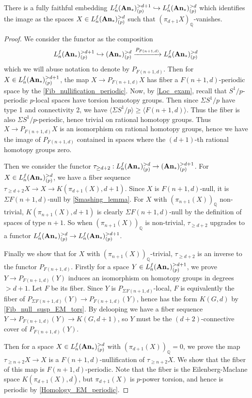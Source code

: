 	\begin{prop}\label{Tel_loc_conn_var_rational}
		There is a fully faithful embedding $L_n^f(\mathbf{An}_*)_{(p)}^{>d+1}\hookrightarrow L_n^f(\mathbf{An}_*)_{(p)}^{>d}$ which identifies the image as the spaces $X\in L_n^f(\mathbf{An}_*)_{(p)}^{>d}$ such that $(\pi_{d+1}X)_\mathbb{Q}$-vanishes. 
	\end{prop}
	\begin{proof}
		We consider the functor as the composition 
		\[ L_n^f(\mathbf{An}_*)_{(p)}^{>d+1}\hookrightarrow(\mathbf{An}_*)_{(p)}^{>d}\xrightarrow{P_{F(n+1,d)}}L_n^f(\mathbf{An}_*)_{(p)}^{>d} \]
		which we will abuse notation to denote by $P_{F(n+1,d)}$. Then for $X\in L_n^f(\mathbf{An}_*)_{(p)}^{>d+1}$, the map $X\to P_{F(n+1,d)}X$ has fiber a $F(n+1,d)$-periodic space by the \cref{Fib_nullification_periodic}. Now, by \cref{Loc_exam}, recall that $S^1/p$-periodic $p$-local spaces have torsion homotopy groups. Then since $\Sigma S^1/p$ have type 1 and connectivity 2, we have $\langle\Sigma S^1/p\rangle\geq\langle F(n+1,d)\rangle$. Thus the fiber is also $\Sigma S^1/p$-periodic, hence trivial on rational homotopy groups. Thus $X\to P_{F(n+1,d)}X$ is an isomorphism on rational homotopy groups, hence we have the image of $P_{F(n+1,d)}$ contained in spaces where the $(d+1)$-th rational homotopy groups zero. 

		Then we consider the functor $\tau_{\geq d+2}:L_n^f(\mathbf{An}_*)_{(p)}^{>d}\to(\mathbf{An}_*)_{(p)}^{>d+1}$. For $X\in L_n^f(\mathbf{An}_*)_{(p)}^{>d}$, we have a fiber sequence $\tau_{\geq d+2}X\to X\to K(\pi_{d+1}(X),d+1)$. Since $X$ is $F(n+1,d)$-null, it is $\Sigma F(n+1,d)$-null by \cref{Smashing_lemma}. For $X$ with $(\pi_{n+1}(X))_\mathbb{Q}$ non-trivial, $K(\pi_{n+1}(X),d+1)$ is clearly $\Sigma F(n+1,d)$-null by the definition of spaces of type $n+1$. So when $(\pi_{n+1}(X))_\mathbb{Q}$ is non-trivial, $\tau_{\geq d+2}$ upgrades to a functor $L_n^f(\mathbf{An}_*)_{(p)}^{>d}\to L_n^f(\mathbf{An}_*)_{(p)}^{>d+1}$. 

		Finally we show that for $X$ with $(\pi_{n+1}(X))_\mathbb{Q}$-trivial, $\tau_{\geq d+2}$ is an inverse to the functor $P_{F(n+1,d)}$. Firstly for a space $Y\in L_n^f(\mathbf{An}_*)_{(p)}^{>d+1}$, we prove $Y\to P_{F(n+1,d)}(Y)$ induces an isomorphism on homotopy groups in degrees $>d+1$. Let $F$ be its fiber. Since $Y$ is $P_{\Sigma F(n+1,d)}$-local, $F$ is equivalently the fiber of $P_{\Sigma F(n+1,d)}(Y)\to P_{F(n+1,d)}(Y)$, hence has the form $K(G,d)$ by \cref{Fib_null_susp_EM_tors}. By delooping we have a fiber sequence $Y\to P_{F(n+1,d)}(Y)\to K(G,d+1)$, so $Y$ must be the $(d+2)$-connective cover of $P_{F(n+1,d)}(Y)$. 

		Then for a space $X\in L_n^f(\mathbf{An}_*)_{(p)}^{>d}$ with $(\pi_{d+1}(X))_\mathbb{Q}=0$, we prove the map $\tau_{\geq n+2}X\to X$ is a $F(n+1,d)$-nullification of $\tau_{\geq n+2}X$. We show that the fiber of this map is $F(n+1,d)$-periodic. Note that the fiber is the Eilenberg-Maclane space $K(\pi_{d+1}(X),d)$, but $\pi_{d+1}(X)$ is $p$-power torsion, and hence is periodic by \cref{Homology_EM_periodic}. 
	\end{proof}

